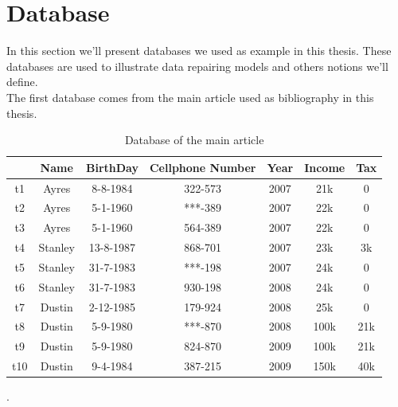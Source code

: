 \documentclass[letterpaper, 12pt]{report}
\newcommand{\alinea}{
\hspace*{0.5cm}}
\begin{document}
\section{Database}

\alinea In this section we'll present databases we used as example in this thesis. These databases are used to illustrate data repairing models and others notions we'll  define.\\

The first database comes from the main article used as bibliography in this thesis\cite{main}.

\begin{table}[H]
	\centering
	\begin{tabular}{|c|c c c c c c|}
	\hline
	    & Name & BirthDay & Cellphone Number & Year & Income & Tax\\
	\hline
	 t1 & Ayres & 8-8-1984 & 322-573 & 2007 & 21k & 0\\
	 t2 & Ayres & 5-1-1960 & ***-389 & 2007 & 22k & 0 \\
	 t3 & Ayres & 5-1-1960 & 564-389 & 2007 & 22k & 0 \\
	 t4 & Stanley & 13-8-1987 & 868-701 & 2007 & 23k & 3k\\
	 t5 & Stanley & 31-7-1983 & ***-198 & 2007 & 24k & 0\\
	 t6 & Stanley & 31-7-1983 & 930-198 & 2008 & 24k & 0\\
	 t7 & Dustin & 2-12-1985 & 179-924 & 2008 & 25k & 0 \\
	 t8 & Dustin & 5-9-1980 & ***-870 & 2008 & 100k & 21k \\
	 t9 & Dustin & 5-9-1980 & 824-870 & 2009 & 100k & 21k \\
	 t10 & Dustin & 9-4-1984 & 387-215 & 2009 & 150k & 40k \\
	 \hline
	\end{tabular}
	\caption{\label{tableMain} Database of the main article\cite{main}}.
\end{table}
\end{document}
